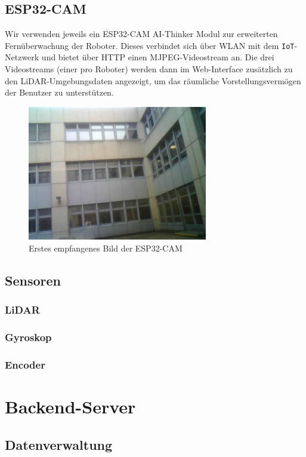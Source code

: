 \documentclass[12pt]{article}
\begin{document}
	\subsection{ESP32-CAM}
	Wir verwenden jeweils ein ESP32-CAM AI-Thinker Modul zur erweiterten
	Fernüberwachung der Roboter.
	Dieses verbindet sich über WLAN mit dem \texttt{IoT}-Netzwerk und bietet über HTTP einen MJPEG-Videostream an.
	Die drei Videostreams (einer pro Roboter) werden dann im Web-Interface
	zusätzlich zu den LiDAR-Umgebungsdaten angezeigt,
	um das räumliche Vorstellungsvermögen der Benutzer zu unterstützen.
	\begin{figure}[H]
		\includegraphics[width=0.7\textwidth, center]{img/cam_erstes_bild.png}
		\caption{Erstes empfangenes Bild der ESP32-CAM}
		\label{fig:cam_erstes_bild}
	\end{figure}
	\subsection{Sensoren}
	\subsubsection{LiDAR}
	\label{lidar}
	\subsubsection{Gyroskop}
	\subsubsection{Encoder}
	\section{Backend-Server}
	\subsection{Datenverwaltung}
\end{document}
